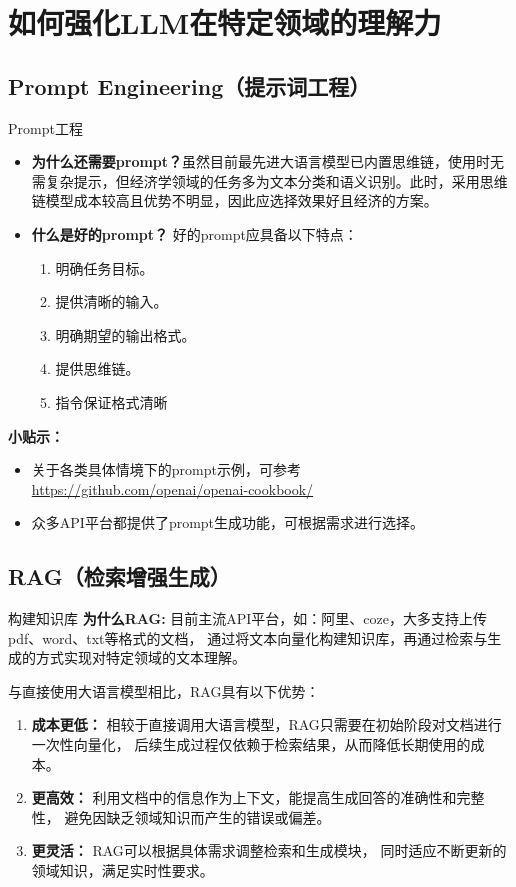 \documentclass{beamer}
\begin{document}
\section{如何强化LLM在特定领域的理解力}
\subsection{Prompt Engineering（提示词工程）}
\begin{frame}[fragile]{Prompt工程}
    \small
\begin{itemize}
  \item \textbf{为什么还需要prompt？}虽然目前最先进大语言模型已内置思维链，使用时无需复杂提示，但经济学领域的任务多为文本分类和语义识别。此时，采用思维链模型成本较高且优势不明显，因此应选择效果好且经济的方案。
  \item \textbf{什么是好的prompt？} 好的prompt应具备以下特点：
   \begin{enumerate}
      \item 明确任务目标。
      \item 提供清晰的输入。
      \item 明确期望的输出格式。
      \item 提供思维链。
      \item 指令保证格式清晰
    \end{enumerate}
\end{itemize}
\textbf{小贴示：} 
\begin{itemize}
    \item 关于各类具体情境下的prompt示例，可参考\url{https://github.com/openai/openai-cookbook/}
    \item 众多API平台都提供了prompt生成功能，可根据需求进行选择。
\end{itemize}

\end{frame}

\subsection{RAG（检索增强生成）}
\begin{frame}[fragile]{构建知识库}
\small
\textbf{为什么RAG:} 目前主流API平台，如：阿里、coze，大多支持上传pdf、word、txt等格式的文档，
通过将文本向量化构建知识库，再通过检索与生成的方式实现对特定领域的文本理解。

与直接使用大语言模型相比，RAG具有以下优势：
\begin{enumerate}
    \item \textbf{成本更低：} 相较于直接调用大语言模型，RAG只需要在初始阶段对文档进行一次性向量化，
          后续生成过程仅依赖于检索结果，从而降低长期使用的成本。
    \item \textbf{更高效：} 利用文档中的信息作为上下文，能提高生成回答的准确性和完整性，
    避免因缺乏领域知识而产生的错误或偏差。
\item \textbf{更灵活：} RAG可以根据具体需求调整检索和生成模块，
    同时适应不断更新的领域知识，满足实时性要求。
\end{enumerate}
\end{frame}
\end{document}
